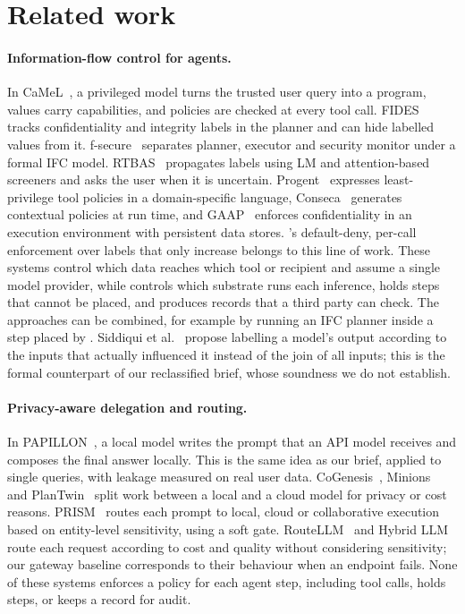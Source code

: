 \section{Related work}
\label{sec:related}

\paragraph{Information-flow control for agents.} In CaMeL~\citep{debenedetti2025camel}, a
privileged model turns the trusted user query into a program, values carry capabilities, and
policies are checked at every tool call. FIDES~\citep{costa2025fides} tracks confidentiality
and integrity labels in the planner and can hide labelled values from it.
f-secure~\citep{wu2024fsecure} separates planner, executor and security monitor under a formal
IFC model. RTBAS~\citep{zhong2025rtbas} propagates labels using LM and attention-based screeners
and asks the user when it is uncertain. Progent~\citep{shi2025progent} expresses
least-privilege tool policies in a domain-specific language, Conseca~\citep{tsai2025conseca}
generates contextual policies at run time, and GAAP~\citep{stanley2026gaap} enforces
confidentiality in an execution environment with persistent data stores. \annona's
default-deny, per-call enforcement over labels that only increase belongs to this line of
work. These systems control which data reaches which tool or recipient and assume a single
model provider, while \annona{} controls which substrate runs each inference, holds steps that
cannot be placed, and produces records that a third party can check. The approaches can be
combined, for example by running an IFC planner inside a step placed by \annona. Siddiqui et
al.~\citep{siddiqui2024permissive} propose labelling a model's output according to the inputs
that actually influenced it instead of the join of all inputs; this is the formal counterpart of
our reclassified brief, whose soundness we do not establish.

\paragraph{Privacy-aware delegation and routing.} In PAPILLON~\citep{li2025papillon}, a local
model writes the prompt that an API model receives and composes the final answer locally. This
is the same idea as our brief, applied to single queries, with leakage measured on real user
data. CoGenesis~\citep{zhang2024cogenesis}, Minions~\citep{narayan2025minions} and
PlanTwin~\citep{yu2026plantwin} split work between a local and a cloud model for privacy or
cost reasons. PRISM~\citep{zhan2026prism} routes each prompt to local, cloud or collaborative
execution based on entity-level sensitivity, using a soft gate. RouteLLM~\citep{ong2024routellm}
and Hybrid LLM~\citep{ding2024hybrid} route each request according to cost and quality without
considering sensitivity; our gateway baseline corresponds to their behaviour when an endpoint
fails. None of these systems enforces a policy for each agent step, including tool calls, holds
steps, or keeps a record for audit.

